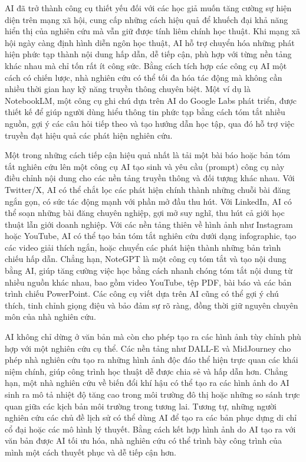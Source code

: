 AI đã trở thành công cụ thiết yếu đối với các học giả muốn tăng cường sự hiện diện trên mạng xã hội, cung cấp những cách hiệu quả để khuếch đại khả năng hiển thị của nghiên cứu mà vẫn giữ được tính liêm chính học thuật. Khi mạng xã hội ngày càng định hình diễn ngôn học thuật, AI hỗ trợ chuyển hóa những phát hiện phức tạp thành nội dung hấp dẫn, dễ tiếp cận, phù hợp với từng nền tảng khác nhau mà chỉ tốn rất ít công sức. Bằng cách tích hợp các công cụ AI một cách có chiến lược, nhà nghiên cứu có thể tối đa hóa tác động mà không cần nhiều thời gian hay kỹ năng truyền thông chuyên biệt. Một ví dụ là NotebookLM, một công cụ ghi chú dựa trên AI do Google Labs phát triển, được thiết kế để giúp người dùng hiểu thông tin phức tạp bằng cách tóm tắt nhiều nguồn, gợi ý các câu hỏi tiếp theo và tạo hướng dẫn học tập, qua đó hỗ trợ việc truyền đạt hiệu quả các phát hiện nghiên cứu.

Một trong những cách tiếp cận hiệu quả nhất là tải một bài báo hoặc bản tóm tắt nghiên cứu lên một công cụ AI tạo sinh và yêu cầu (prompt) công cụ này điều chỉnh nội dung cho các nền tảng truyền thông và đối tượng khác nhau. Với Twitter/X, AI có thể chắt lọc các phát hiện chính thành những chuỗi bài đăng ngắn gọn, có sức tác động mạnh với phần mở đầu thu hút. Với LinkedIn, AI có thể soạn những bài đăng chuyên nghiệp, gợi mở suy nghĩ, thu hút cả giới học thuật lẫn giới doanh nghiệp. Với các nền tảng thiên về hình ảnh như Instagram hoặc YouTube, AI có thể tạo bản tóm tắt nghiên cứu dưới dạng infographic, tạo các video giải thích ngắn, hoặc chuyển các phát hiện thành những bản trình chiếu hấp dẫn. Chẳng hạn, NoteGPT là một công cụ tóm tắt và tạo nội dung bằng AI, giúp tăng cường việc học bằng cách nhanh chóng tóm tắt nội dung từ nhiều nguồn khác nhau, bao gồm video YouTube, tệp PDF, bài báo và các bản trình chiếu PowerPoint. Các công cụ viết dựa trên AI cũng có thể gợi ý chú thích, tinh chỉnh giọng điệu và bảo đảm sự rõ ràng, đồng thời giữ nguyên chuyên môn của nhà nghiên cứu.

AI không chỉ dừng ở văn bản mà còn cho phép tạo ra các hình ảnh tùy chỉnh phù hợp với một nghiên cứu cụ thể. Các nền tảng như DALL-E và MidJourney cho phép nhà nghiên cứu tạo ra những hình ảnh độc đáo thể hiện trực quan các khái niệm chính, giúp công trình học thuật dễ được chia sẻ và hấp dẫn hơn. Chẳng hạn, một nhà nghiên cứu về biến đổi khí hậu có thể tạo ra các hình ảnh do AI sinh ra mô tả nhiệt độ tăng cao trong môi trường đô thị hoặc những so sánh trực quan giữa các kịch bản môi trường trong tương lai. Tương tự, những người nghiên cứu các chủ đề lịch sử có thể dùng AI để tạo ra các bản phục dựng di chỉ cổ đại hoặc các mô hình lý thuyết. Bằng cách kết hợp hình ảnh do AI tạo ra với văn bản được AI tối ưu hóa, nhà nghiên cứu có thể trình bày công trình của mình một cách thuyết phục và dễ tiếp cận hơn.

